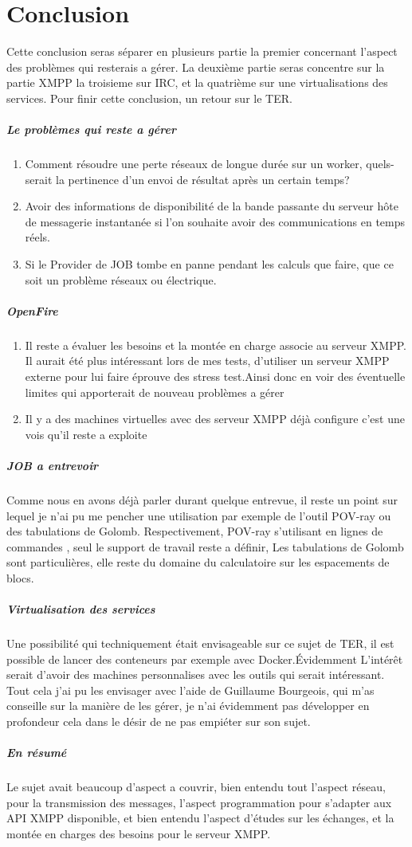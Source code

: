 \documentclass[11pt]{article}
\begin{document}
\newpage
\section{Conclusion}
Cette conclusion seras séparer en plusieurs partie la premier concernant l'aspect des problèmes qui resterais a gérer. La deuxième partie seras concentre sur la partie XMPP la troisieme sur IRC, et la quatrième sur une virtualisations des services. Pour finir cette conclusion, un retour sur le TER.
\subparagraph{Le problèmes qui reste a gérer}
\begin{enumerate}
	\item Comment résoudre une perte réseaux  de longue durée sur un worker, quels-serait la pertinence d'un envoi de résultat après un certain temps? 
	\item Avoir des informations de disponibilité de la bande passante du serveur hôte de messagerie instantanée si l'on souhaite avoir des communications en temps réels.
	\item Si le Provider de JOB tombe en panne pendant les calculs que faire, que ce soit un problème réseaux ou électrique. 
\end{enumerate}
\subparagraph{OpenFire}
\begin{enumerate}
\item Il reste a évaluer les besoins et la montée en charge associe au serveur XMPP. Il aurait été plus intéressant lors de mes tests, d'utiliser un serveur XMPP externe pour lui faire éprouve des stress test.Ainsi donc en voir des éventuelle limites qui apporterait de nouveau problèmes a gérer 
\item Il y a des machines virtuelles avec des serveur XMPP déjà configure c'est une vois qu'il reste a exploite 
\end{enumerate}

\subparagraph{JOB a entrevoir} 
Comme nous en avons déjà parler durant quelque entrevue, il reste un point sur lequel je n'ai pu me pencher une utilisation par exemple de l'outil POV-ray ou des tabulations de Golomb. Respectivement, POV-ray s'utilisant en lignes de commandes , seul le support de travail reste a définir, Les tabulations de Golomb sont particulières, elle reste du domaine du calculatoire sur les espacements de blocs. 
\subparagraph{Virtualisation des services}
Une possibilité qui techniquement était envisageable sur ce sujet de TER,  il est possible de lancer des conteneurs par exemple avec Docker.Évidemment L’intérêt serait d'avoir des machines personnalises avec les outils qui serait intéressant. Tout cela j'ai pu les envisager avec l'aide de Guillaume Bourgeois, qui m'as conseille sur la manière de les gérer, je n'ai évidemment pas développer en profondeur cela dans le désir de ne pas empiéter sur son sujet.
\subparagraph{En résumé } 
Le sujet avait beaucoup d'aspect a couvrir, bien entendu tout l'aspect réseau, pour la transmission des messages, l'aspect programmation pour s'adapter aux API XMPP disponible, et bien entendu l'aspect d’études sur les échanges, et la montée en charges  des besoins pour le serveur XMPP.
\end{document}
